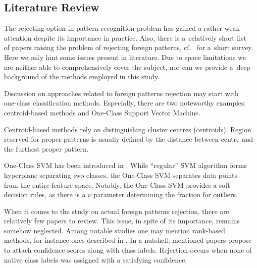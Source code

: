 \documentclass{llncs}
\begin{document}
\vspace{-6pt}
\subsection{Literature Review}
  \label{sec:Literature Review}
\vspace{-3pt}

The rejecting option in pattern recognition problem has gained a rather weak attention despite its importance in practice. Also, there is a~relatively short list of papers raising the problem of rejecting foreign patterns, cf.~\cite{HomendaICAART2015} for a~short survey. %
Here we only hint some issues present in literature. Due to space limitations we are neither able to comprehensively cover the subject, nor can we provide a~deep background of the methods employed in this study.

Discussion on approaches related to foreign patterns rejection may start with one-class classification methods. Especially, there are two noteworthy examples: centroid-based methods and One-Class Support Vector Machine.

Centroid-based methods rely on distinguishing cluster centres (centroids). Region reserved for proper patterns is usually defined by the distance between centre and the furthest proper pattern.

One-Class SVM has been introduced in \cite{ScholkopfWilliamsonSmola1992}. While ``regular'' SVM algorithm forms hyperplane separating two classes, the One-Class SVM separates data points from the entire feature space. Notably, the One-Class SVM provides a soft decision rules, as there is a $\nu$ parameter determining the fraction for outliers.  


When it comes to the study on actual foreign patterns rejection, there are relatively few papers to review. This issue, in spite of its importance, remains somehow neglected. Among notable studies one may mention rank-based methods, for instance ones described in \cite{BertolamiZimmermannBunke2006,BurgerKessentiniPaquet2011,EladHel-OrKeshet2001,HempstalkFrankWitten2008,SchemeHudginsEnglehart2013,TaxDuin2008,WangCasasent2009}.
In a nutshell, mentioned papers propose to attach confidence scores along with class labels. Rejection occurs when none of native class labels was assigned with a satisfying confidence.
\end{document}
